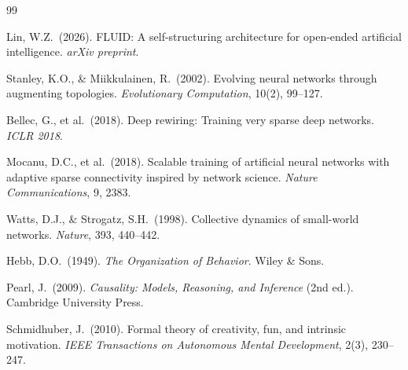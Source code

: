 \documentclass[12pt]{article}
\begin{document}
\begin{thebibliography}{99}

 Lin, W.Z.\ (2026). FLUID: A self-structuring architecture for open-ended artificial intelligence. \textit{arXiv preprint}.

 Stanley, K.O., \& Miikkulainen, R.\ (2002). Evolving neural networks through augmenting topologies. \textit{Evolutionary Computation}, 10(2), 99--127.

 Bellec, G., et al.\ (2018). Deep rewiring: Training very sparse deep networks. \textit{ICLR 2018}.

 Mocanu, D.C., et al.\ (2018). Scalable training of artificial neural networks with adaptive sparse connectivity inspired by network science. \textit{Nature Communications}, 9, 2383.

 Watts, D.J., \& Strogatz, S.H.\ (1998). Collective dynamics of small-world networks. \textit{Nature}, 393, 440--442.

 Hebb, D.O.\ (1949). \textit{The Organization of Behavior}. Wiley \& Sons.

 Pearl, J.\ (2009). \textit{Causality: Models, Reasoning, and Inference} (2nd ed.). Cambridge University Press.

 Schmidhuber, J.\ (2010). Formal theory of creativity, fun, and intrinsic motivation. \textit{IEEE Transactions on Autonomous Mental Development}, 2(3), 230--247.

\end{thebibliography}
\end{document}
